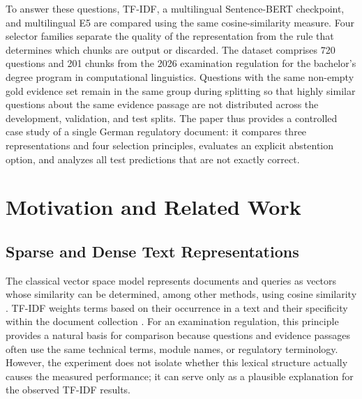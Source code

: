 \documentclass[11pt]{article}
\begin{document}
To answer these questions, TF-IDF, a multilingual Sentence-BERT checkpoint, and multilingual E5 are compared using the same cosine-similarity measure. Four selector families separate the quality of the representation from the rule that determines which chunks are output or discarded. The dataset comprises 720 questions and 201 chunks from the 2026 examination regulation for the bachelor's degree program in computational linguistics. Questions with the same non-empty gold evidence set remain in the same group during splitting so that highly similar questions about the same evidence passage are not distributed across the development, validation, and test splits. The paper thus provides a controlled case study of a single German regulatory document: it compares three representations and four selection principles, evaluates an explicit abstention option, and analyzes all test predictions that are not exactly correct.


\section{Motivation and Related Work}

\subsection{Sparse and Dense Text Representations}

The classical vector space model represents documents and queries as vectors whose similarity can be determined, among other methods, using cosine similarity \citep{salton1975vector}. TF-IDF weights terms based on their occurrence in a text and their specificity within the document collection \citep{sparckjones1972statistical}. For an examination regulation, this principle provides a natural basis for comparison because questions and evidence passages often use the same technical terms, module names, or regulatory terminology. However, the experiment does not isolate whether this lexical structure actually causes the measured performance; it can serve only as a plausible explanation for the observed TF-IDF results.
\end{document}
